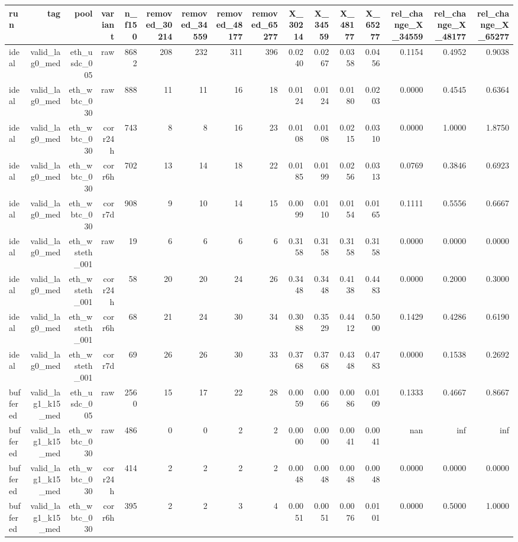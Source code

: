 \begin{tabular}{lrrrrrrrrrrrrrrr}
\toprule
run & tag & pool & variant & n\_f150 & removed\_30214 & removed\_34559 & removed\_48177 & removed\_65277 & X\_30214 & X\_34559 & X\_48177 & X\_65277 & rel\_change\_X\_34559 & rel\_change\_X\_48177 & rel\_change\_X\_65277 \\
\midrule
ideal & valid\_lag0\_med & eth\_usdc\_005 & raw & 8682 & 208 & 232 & 311 & 396 & 0.0240 & 0.0267 & 0.0358 & 0.0456 & 0.1154 & 0.4952 & 0.9038 \\
ideal & valid\_lag0\_med & eth\_wbtc\_030 & raw & 888 & 11 & 11 & 16 & 18 & 0.0124 & 0.0124 & 0.0180 & 0.0203 & 0.0000 & 0.4545 & 0.6364 \\
ideal & valid\_lag0\_med & eth\_wbtc\_030 & corr24h & 743 & 8 & 8 & 16 & 23 & 0.0108 & 0.0108 & 0.0215 & 0.0310 & 0.0000 & 1.0000 & 1.8750 \\
ideal & valid\_lag0\_med & eth\_wbtc\_030 & corr6h & 702 & 13 & 14 & 18 & 22 & 0.0185 & 0.0199 & 0.0256 & 0.0313 & 0.0769 & 0.3846 & 0.6923 \\
ideal & valid\_lag0\_med & eth\_wbtc\_030 & corr7d & 908 & 9 & 10 & 14 & 15 & 0.0099 & 0.0110 & 0.0154 & 0.0165 & 0.1111 & 0.5556 & 0.6667 \\
ideal & valid\_lag0\_med & eth\_wsteth\_001 & raw & 19 & 6 & 6 & 6 & 6 & 0.3158 & 0.3158 & 0.3158 & 0.3158 & 0.0000 & 0.0000 & 0.0000 \\
ideal & valid\_lag0\_med & eth\_wsteth\_001 & corr24h & 58 & 20 & 20 & 24 & 26 & 0.3448 & 0.3448 & 0.4138 & 0.4483 & 0.0000 & 0.2000 & 0.3000 \\
ideal & valid\_lag0\_med & eth\_wsteth\_001 & corr6h & 68 & 21 & 24 & 30 & 34 & 0.3088 & 0.3529 & 0.4412 & 0.5000 & 0.1429 & 0.4286 & 0.6190 \\
ideal & valid\_lag0\_med & eth\_wsteth\_001 & corr7d & 69 & 26 & 26 & 30 & 33 & 0.3768 & 0.3768 & 0.4348 & 0.4783 & 0.0000 & 0.1538 & 0.2692 \\
buffered & valid\_lag1\_k15\_med & eth\_usdc\_005 & raw & 2560 & 15 & 17 & 22 & 28 & 0.0059 & 0.0066 & 0.0086 & 0.0109 & 0.1333 & 0.4667 & 0.8667 \\
buffered & valid\_lag1\_k15\_med & eth\_wbtc\_030 & raw & 486 & 0 & 0 & 2 & 2 & 0.0000 & 0.0000 & 0.0041 & 0.0041 & nan & inf & inf \\
buffered & valid\_lag1\_k15\_med & eth\_wbtc\_030 & corr24h & 414 & 2 & 2 & 2 & 2 & 0.0048 & 0.0048 & 0.0048 & 0.0048 & 0.0000 & 0.0000 & 0.0000 \\
buffered & valid\_lag1\_k15\_med & eth\_wbtc\_030 & corr6h & 395 & 2 & 2 & 3 & 4 & 0.0051 & 0.0051 & 0.0076 & 0.0101 & 0.0000 & 0.5000 & 1.0000 \\

\end{tabular}
